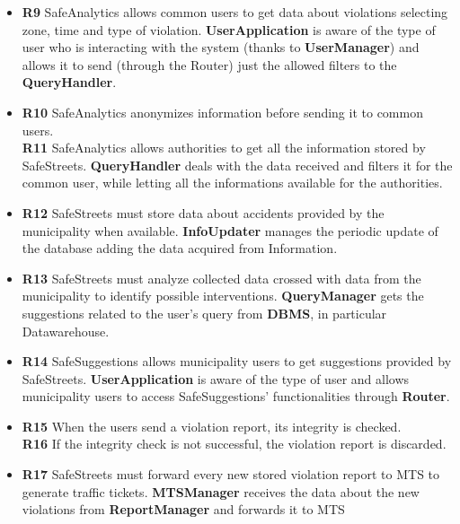 \documentclass[./main.tex]{subfiles}
\begin{document}

\begin{itemize}
\item
  \textbf{R9} SafeAnalytics allows common users to get data about
  violations selecting zone, time and type of violation.
  \subitem	
	\textbf{UserApplication} is aware of the type of user who is interacting with the system (thanks to \textbf{UserManager}) and allows it to send (through the Router) just the allowed filters to the \textbf{QueryHandler}.
  
\item
  \textbf{R10} SafeAnalytics anonymizes information before sending it to
  common users.\\
  \textbf{R11} SafeAnalytics allows authorities to get all the information
  stored by SafeStreets.
  \subitem
    \textbf{QueryHandler} deals with the data received and filters it for the common user, while letting all the informations available for the authorities.

\end{itemize}

\begin{itemize}
\item
  \textbf{R12} SafeStreets must store data about accidents provided by
  the municipality when available.
  \subitem
    \textbf{InfoUpdater} manages the periodic update of the database adding the data acquired from Information.
    
\item
  \textbf{R13} SafeStreets must analyze collected data crossed with data
  from the municipality to identify possible interventions.
  \subitem
    \textbf{QueryManager} gets the suggestions related to the user's query from \textbf{DBMS}, in particular {Datawarehouse}.
    
\item
  \textbf{R14} SafeSuggestions allows municipality users to get
  suggestions provided by SafeStreets.
  \subitem
  	\textbf{UserApplication} is aware of the type of user and  allows municipality users to access SafeSuggestions' functionalities through \textbf{Router}. 
\end{itemize}


\begin{itemize}
\item
  \textbf{R15} When the users send a violation report, its integrity is
  checked. \\
  \textbf{R16} If the integrity check is not successful, the violation
  report is discarded.
  \subitem
  
\item
  \textbf{R17} SafeStreets must forward every new stored violation
  report to MTS to generate traffic tickets.
  \subitem
    \textbf{MTSManager} receives the data about the new violations from \textbf{ReportManager} and forwards it to MTS
\end{itemize}
\end{document}
